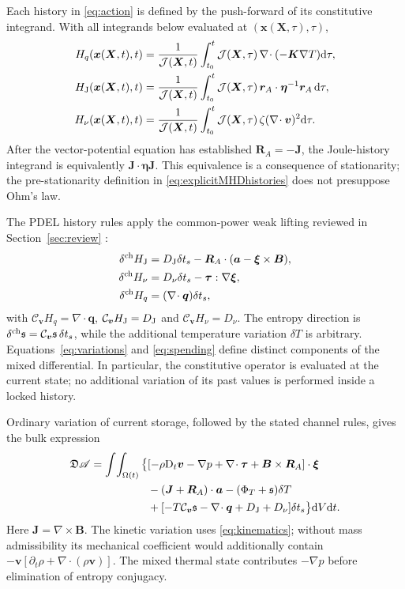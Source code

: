 \documentclass[11pt,a4paper]{article}
\theoremstyle{remark}\newtheorem{remark}{Remark}
\numberwithin{equation}{section}
\newcommand{\dd}{\mathrm{d}}
\newcommand{\vv}{\boldsymbol v}
\newcommand{\BB}{\boldsymbol B}
\newcommand{\JJ}{\boldsymbol J}
\newcommand{\xx}{\boldsymbol x}
\newcommand{\XX}{\boldsymbol X}
\newcommand{\xii}{\boldsymbol\xi}
\newcommand{\atest}{\boldsymbol a}
\newcommand{\ttau}{\boldsymbol\tau}
\newcommand{\etab}{\boldsymbol\eta}
\newcommand{\qv}{\boldsymbol q}
\newcommand{\grad}{\nabla}
\newcommand{\diver}{\nabla\!\cdot}
\newcommand{\curl}{\nabla\!\times}
\newcommand{\Dt}{\mathrm D_t}
\newcommand{\Cv}{\mathcal C_{\vv}}
\newcommand{\st}{\mathfrak s}
\begin{document}
Each history in \eqref{eq:action} is defined by the push-forward of its constitutive integrand. With all integrands below evaluated at $(\xx(\XX,\tau),\tau)$,
\begin{equation}
\begin{aligned}
H_q(\xx(\XX,t),t)
&=\frac1{\mathcal J(\XX,t)}\int_{t_0}^{t}\mathcal J(\XX,\tau)\,
\diver(-\boldsymbol K\grad T)\dd\tau,\\
H_{\rm J}(\xx(\XX,t),t)
&=\frac1{\mathcal J(\XX,t)}\int_{t_0}^{t}\mathcal J(\XX,\tau)\,
\boldsymbol r_A\cdot\etab^{-1}\boldsymbol r_A\,\dd\tau,\\
H_\nu(\xx(\XX,t),t)
&=\frac1{\mathcal J(\XX,t)}\int_{t_0}^{t}\mathcal J(\XX,\tau)\,
\zeta(\diver\vv)^2\dd\tau.
\end{aligned}
\label{eq:explicitMHDhistories}
\end{equation}
After the vector-potential equation has established $\boldsymbol R_A=-\JJ$, the Joule-history integrand is equivalently $\JJ\cdot\etab\JJ$. This equivalence is a consequence of stationarity; the pre-stationarity definition in \eqref{eq:explicitMHDhistories} does not presuppose Ohm's law.


The PDEL history rules apply the common-power weak lifting reviewed in Section~\ref{sec:review} \citep{RenSpending,RenEulerian,RenMultiChannel}:
\begin{equation}
\begin{aligned}
\delta^{\rm ch}H_{\rm J}
&=D_{\rm J}\delta t_s-\boldsymbol R_A\cdot(\atest-\xii\times\BB),\\
\delta^{\rm ch}H_\nu&=D_\nu\delta t_s-\ttau:\grad\xii,\\
\delta^{\rm ch}H_q&=(\diver\qv)\delta t_s,
\end{aligned}
\label{eq:spending}
\end{equation}
with $\Cv H_q=\diver\qv$, $\Cv H_{\rm J}=D_{\rm J}$ and $\Cv H_\nu=D_\nu$. The entropy direction is $\delta^{\rm ch}\st=\Cv\st\,\delta t_s$, while the additional temperature variation $\delta T$ is arbitrary. Equations~\eqref{eq:variations} and \eqref{eq:spending} define distinct components of the mixed differential. In particular, the constitutive operator is evaluated at the current state; no additional variation of its past values is performed inside a locked history.

Ordinary variation of current storage, followed by the stated channel rules, gives the bulk expression
\begin{equation}
\begin{aligned}
\mathfrak D\mathscr A=\int\!\int_{\Omega(t)}\big\{&
[-\rho\Dt\vv-\grad p+\diver\ttau+\BB\times\boldsymbol R_A]\cdot\xii\\
&-(\JJ+\boldsymbol R_A)\cdot\atest-(\Phi_T+\st)\delta T\\
&+[-T\Cv\st-\diver\qv+D_{\rm J}+D_\nu]\delta t_s\big\}\dd V\dd t.
\end{aligned}
\label{eq:jointdifferential}
\end{equation}
Here $\JJ=\curl\BB$. The kinetic variation uses \eqref{eq:kinematics}; without mass admissibility its mechanical coefficient would additionally contain $-\vv[\partial_t\rho+\diver(\rho\vv)]$. The mixed thermal state contributes $-\grad p$ before elimination of entropy conjugacy.
\end{document}
